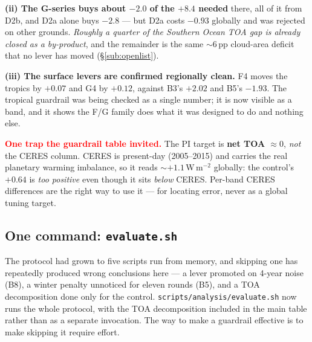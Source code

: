 \documentclass[10pt]{article}
\begin{document}
\textbf{(ii) The G-series buys about $-2.0$ of the $+8.4$ needed} there, all of it from D2b,
and D2a alone buys $-2.8$ --- but D2a costs $-0.93$ globally and was rejected on other
grounds. \emph{Roughly a quarter of the Southern Ocean TOA gap is already closed as a
by-product}, and the remainder is the same $\sim6$\,pp cloud-area deficit that no lever has
moved (\S\ref{sub:openlist}).

\textbf{(iii) The surface levers are confirmed regionally clean.} F4 moves the tropics by
$+0.07$ and G4 by $+0.12$, against B3's $+2.02$ and B5's $-1.93$. The tropical guardrail was
being checked as a single number; it is now visible as a band, and it shows the F/G family
does what it was designed to do and nothing else.

\textcolor{red}{\textbf{One trap the guardrail table invited.}} The PI target is
\textbf{net TOA $\approx 0$}, \emph{not} the CERES column. CERES is present-day (2005--2015)
and carries the real planetary warming imbalance, so it reads $\sim+1.1$\,W\,m$^{-2}$
globally: the control's $+0.64$ is \emph{too positive} even though it sits \emph{below}
CERES. Per-band CERES differences are the right way to use it --- for locating error, never
as a global tuning target.

\subsection{One command: \texttt{evaluate.sh}}\label{sub:evalsh}
The protocol had grown to five scripts run from memory, and skipping one has repeatedly
produced wrong conclusions here --- a lever promoted on 4-year noise (B8), a winter penalty
unnoticed for eleven rounds (B5), and a TOA decomposition done only for the control.
\texttt{scripts/analysis/evaluate.sh} now runs the whole protocol, with the TOA decomposition
included in the main table rather than as a separate invocation. The way to make a guardrail
effective is to make skipping it require effort.
\end{document}
